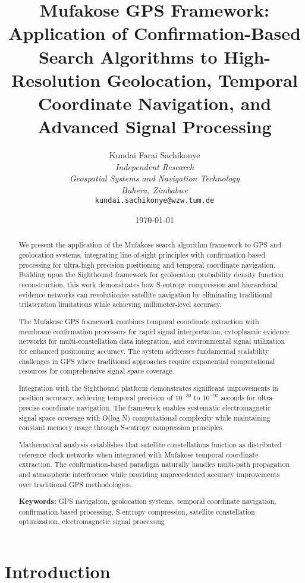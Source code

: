 \documentclass[12pt,a4paper]{article}
\title{\textbf{Mufakose GPS Framework: Application of Confirmation-Based Search Algorithms to High-Resolution Geolocation, Temporal Coordinate Navigation, and Advanced Signal Processing}}
\author{
Kundai Farai Sachikonye\\
\textit{Independent Research}\\
\textit{Geospatial Systems and Navigation Technology}\\
\textit{Buhera, Zimbabwe}\\
\texttt{kundai.sachikonye@wzw.tum.de}
}
\date{\today}
\begin{document}
\maketitle

\begin{abstract}
We present the application of the Mufakose search algorithm framework to GPS and geolocation systems, integrating line-of-sight principles with confirmation-based processing for ultra-high precision positioning and temporal coordinate navigation. Building upon the Sighthound framework for geolocation probability density function reconstruction, this work demonstrates how S-entropy compression and hierarchical evidence networks can revolutionize satellite navigation by eliminating traditional trilateration limitations while achieving millimeter-level accuracy.

The Mufakose GPS framework combines temporal coordinate extraction with membrane confirmation processors for rapid signal interpretation, cytoplasmic evidence networks for multi-constellation data integration, and environmental signal utilization for enhanced positioning accuracy. The system addresses fundamental scalability challenges in GPS where traditional approaches require exponential computational resources for comprehensive signal space coverage.

Integration with the Sighthound platform demonstrates significant improvements in position accuracy, achieving temporal precision of $10^{-30}$ to $10^{-90}$ seconds for ultra-precise coordinate navigation. The framework enables systematic electromagnetic signal space coverage with O(log N) computational complexity while maintaining constant memory usage through S-entropy compression principles.

Mathematical analysis establishes that satellite constellations function as distributed reference clock networks when integrated with Mufakose temporal coordinate extraction. The confirmation-based paradigm naturally handles multi-path propagation and atmospheric interference while providing unprecedented accuracy improvements over traditional GPS methodologies.

\textbf{Keywords:} GPS navigation, geolocation systems, temporal coordinate navigation, confirmation-based processing, S-entropy compression, satellite constellation optimization, electromagnetic signal processing
\end{abstract}

\section{Introduction}
\end{document}

